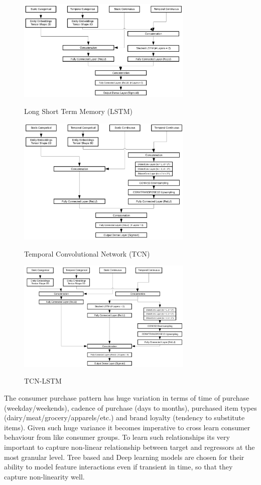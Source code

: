   \begin{figure}[t]
    \centering 
    \caption{Long Short Term Memory (LSTM)} 
    \includegraphics[width=3.3in]{img/LSTM.png} 
    \label{fig:LSTM} 
  \end{figure}
  \begin{figure}[t]
    \centering 
    \caption{Temporal Convolutional Network (TCN)} 
    \includegraphics[width=3.3in]{img/TCN.png} 
    \label{fig:TCN} 
  \end{figure}
  \begin{figure}[t]
    \centering 
    \caption{TCN-LSTM} 
    \includegraphics[width=3.3in]{img/TCNLSTM.png} 
    \label{fig:TCN-LSTM} 
  \end{figure}

The consumer purchase pattern has huge variation in terms of time of purchase (weekday/weekends), 
cadence of purchase (days to months), purchased item types (dairy/meat/grocery/apparels/etc.)
and brand loyalty (tendency to substitute items). Given such huge variance it becomes imperative 
to cross learn consumer behaviour from like consumer groups. To learn such relationships its very 
important to capture non-linear relationship between target and regressors at the most granular level.
Tree based and Deep learning models are chosen for their ability to model feature interactions even if transient in time, 
so that they capture non-linearity well.

